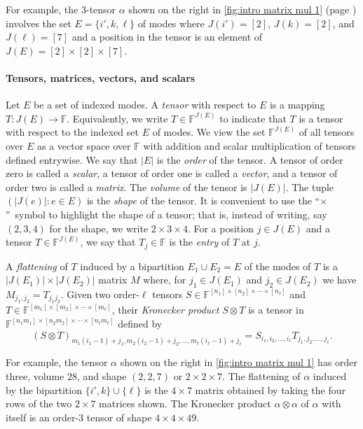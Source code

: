\documentclass{toc}
\newcommand{\F}{\ensuremath{\mathbb{F}}}
\begin{document}
For example, the $3$-tensor $\alpha$ shown on the right 
in \eqref{fig:intro matrix mul 1} (page \pageref{fig:intro matrix mul 1})
involves the %
set $E = \{i', k, \ell\}$ of modes  %
where $J(i') = [2]$,
$J(k) = [2]$, and $J(\ell) = [7]$ and a position in the tensor is an
element of $J(E) = [2] \times [2] \times [7]$.

\paragraph*{Tensors, matrices, vectors, and scalars}

\label{sect:tensor-def}

Let $E$ be a set of indexed modes. A \emph{tensor} with respect to $E$ is
a mapping $T:J(E)\rightarrow \F$. Equivalently, we write $T\in\F^{J(E)}$
to indicate that $T$ is a tensor with respect to the
%
indexed set $E$ of modes.  %
We view the set $\F^{J(E)}$ of all tensors over $E$ as a vector space over $\F$
with addition and scalar multiplication of tensors defined entrywise.
%
We say that $|E|$ is the \emph{order} of the tensor.  A tensor of order
zero is called a \emph{scalar}, a tensor of order one is called a 
\emph{vector}, and a tensor of order two is called a \emph{matrix}.
%
The \emph{volume} of the tensor is $|J(E)|$. The tuple $(|J(e)|:e\in E)$
is the \emph{shape} of the tensor. It is convenient to use the
%
``$\times$''~symbol  %
to %
%
highlight  %
the shape of a tensor; that is,
instead of writing, say $(2,3,4)$ for the shape, we write $2\times 3\times 4$.
For a position $j\in J(E)$ and a tensor $T\in\F^{J(E)}$,
we say that $T_j\in\F$ is the \emph{entry} of $T$ at $j$.


A \emph{flattening} of $T$ induced by a bipartition
%
%
%
$E_1 \cup E_2 = E$
%
of the modes of $T$ is a $|J(E_1)| \times |J(E_2)|$ matrix $M$ where, for $j_1 \in J(E_1)$ and $j_2 \in J(E_2)$ we have $M_{j_1,j_2} = T_{j_1j_2}$.
Given two %
order-$\ell$  %
tensors $S \in \F^{[n_1] \times [n_2] \times \cdots \times [n_\ell]}$ and $T \in \F^{[m_1] \times [m_2] \times \cdots \times [m_\ell]}$, their \emph{Kronecker product} $S \otimes T$ is a tensor in $\F^{[n_1 m_1] \times [n_2 m_2] \times \cdots \times [n_\ell m_\ell]}$ defined by
$$
(S \otimes T)_{m_1(i_1-1)+j_1,m_2(i_2-1)+j_2,\ldots,m_\ell(i_\ell-1)+j_\ell} = S_{i_1,i_2,\ldots,i_\ell} T_{j_1,j_2,\ldots,j_\ell}.
$$

For example, the tensor $\alpha$ shown on the right in \eqref{fig:intro matrix mul 1} has
order three, volume $28$, and shape $(2,2,7)$ or $2 \times 2 \times
7$.  The flattening of $\alpha$ induced by the bipartition $\{i', k\}
\cup \{\ell\}$ is the $4 \times 7$ matrix obtained by taking the four
rows of the two $2\times7$ matrices shown.  The Kronecker product
$\alpha \otimes \alpha$ of $\alpha$ with itself is an
%
order-3   %
tensor of shape $4 \times 4 \times 49$.
\end{document}
